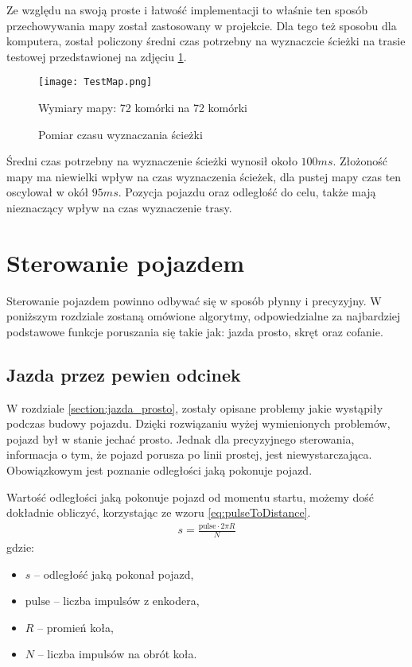             Ze względu na swoją proste i łatwość implementacji to właśnie ten sposób przechowywania mapy został zastosowany w projekcie.
            Dla tego też sposobu dla komputera, został policzony średni czas potrzebny na wyznaczcie ścieżki na trasie testowej przedstawionej na zdjęciu \ref{fig:pathFindingTime}.
            \begin{figure}
                \centering
                \texttt{[image: TestMap.png]}
                \caption{Pomiar czasu wyznaczania ścieżki}
                Wymiary mapy: 72 komórki na 72 komórki
                \label{fig:pathFindingTime}
            \end{figure}

            Średni czas potrzebny na wyznaczenie ścieżki wynosił około $100ms$.
            Złożoność mapy ma niewielki wpływ na czas wyznaczenia ścieżek, dla pustej mapy czas ten oscylował w okół $95ms$.
            Pozycja pojazdu oraz odległość do celu, także mają nieznaczący wpływ na czas wyznaczenie trasy.
            




    
\section{Sterowanie pojazdem}
    Sterowanie pojazdem powinno odbywać się w sposób płynny i precyzyjny.
    W poniższym rozdziale zostaną omówione algorytmy, odpowiedzialne za najbardziej podstawowe funkcje poruszania się takie jak: jazda prosto, skręt oraz cofanie.

    \subsection{Jazda przez pewien odcinek}
    \label{subsec:sterowanie_odległość}
        W rozdziale \ref{section:jazda_prosto}, zostały opisane problemy jakie wystąpiły podczas budowy pojazdu. %
        Dzięki rozwiązaniu wyżej wymienionych problemów, pojazd był w stanie jechać prosto.
        Jednak dla precyzyjnego sterowania, informacja o tym, że pojazd porusza po linii prostej, jest niewystarczająca.
        Obowiązkowym jest poznanie odległości jaką pokonuje pojazd.

        Wartość odległości jaką pokonuje pojazd od momentu startu, możemy dość dokładnie obliczyć, korzystając ze wzoru \eqref{eq:pulseToDistance}.
        \begin{gather}
            s = \frac{\text{pulse} \cdot 2\pi R}{N}
            \label{eq:pulseToDistance}
        \end{gather}
        gdzie:
        \begin{itemize}
            \item $s$ -- odległość jaką pokonał pojazd,
            \item $\text{pulse}$ -- liczba impulsów z enkodera,
            \item $R$ -- promień koła,
            \item $N$ -- liczba impulsów na obrót koła.
        \end{itemize}

